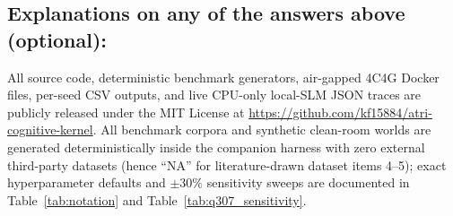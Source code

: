 \subsection*{Explanations on any of the answers above (optional):}
All source code, deterministic benchmark generators, air-gapped 4C4G Docker files, per-seed CSV outputs, and live CPU-only local-SLM JSON traces are publicly released under the MIT License at \url{https://github.com/kf15884/atri-cognitive-kernel}. All benchmark corpora and synthetic clean-room worlds are generated deterministically inside the companion harness with zero external third-party datasets (hence ``NA'' for literature-drawn dataset items 4--5); exact hyperparameter defaults and $\pm 30\%$ sensitivity sweeps are documented in Table~\ref{tab:notation} and Table~\ref{tab:q307_sensitivity}.
